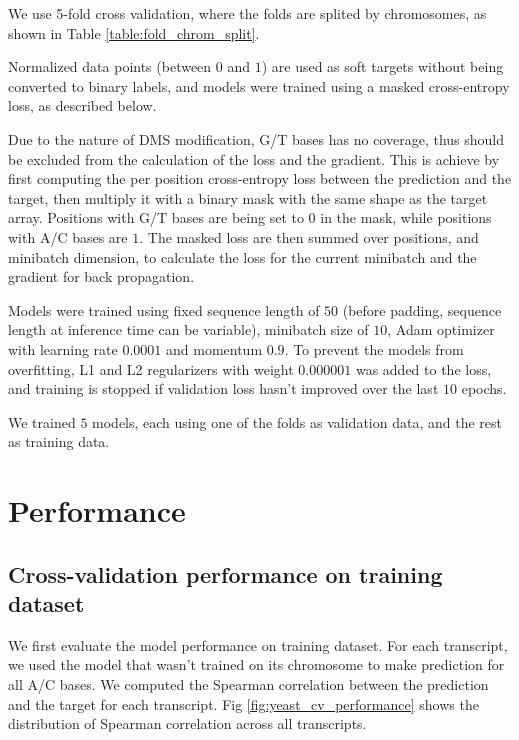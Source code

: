 \documentclass{proposal}
\begin{document}
We use 5-fold cross validation, where the folds are splited by chromosomes, as shown in Table \ref{table:fold_chrom_split}.

Normalized data points (between $0$ and $1$) are used as soft targets without being converted to binary labels,
and models were trained using a masked cross-entropy loss, as described below.

Due to the nature of DMS modification, G/T bases has no coverage,
thus should be excluded from the calculation of the loss and the gradient.
This is achieve by first computing the per position cross-entropy loss between the prediction and the target,
then multiply it with a binary mask with the same shape as the target array.
Positions with G/T bases are being set to $0$ in the mask, while positions with A/C bases are $1$.
The masked loss are then summed over positions, and minibatch dimension, to calculate the loss for the current minibatch and the gradient for back propagation.

Models were trained using fixed sequence length of $50$ (before padding, sequence length at inference time can be variable),
minibatch size of $10$, Adam optimizer with learning rate $0.0001$ and momentum $0.9$.
To prevent the models from overfitting, L1 and L2 regularizers with weight $0.000001$ was added to the loss,
and training is stopped if validation loss hasn't improved over the last $10$ epochs.

We trained $5$ models, each using one of the folds as validation data, and the rest as training data.


\section{Performance}


\subsection{Cross-validation performance on training dataset}

We first evaluate the model performance on training dataset.
For each transcript, we used the model that wasn't trained on its chromosome to make prediction for all A/C bases.
We computed the Spearman correlation between the prediction and the target for each transcript.
Fig \ref{fig:yeast_cv_performance} shows the distribution of Spearman correlation across all transcripts.
\end{document}
